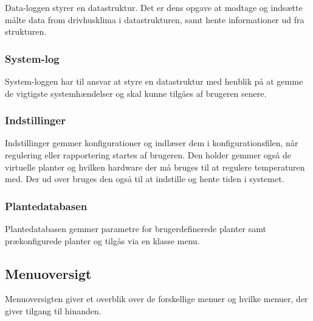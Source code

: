 Data-loggen styrer en datastruktur. Det er dens opgave at modtage og indsætte målte data from drivhusklima i datastrukturen, samt hente informationer ud fra strukturen.

\subsubsection{System-log}

System-loggen har til ansvar at styre en datastruktur med henblik på at gemme de vigtigste systemhændelser og skal kunne tilgåes af brugeren senere.

\subsubsection{Indstillinger}

Indstillinger gemmer konfigurationer og indlæser dem i konfigurationsfilen, når regulering eller rapportering startes af brugeren. Den holder gemmer også de virtuelle planter og hvilken hardware der må bruges til at regulere temperaturen med. Der ud over bruges den også til at indstille og hente tiden i systemet.

\subsubsection{Plantedatabasen}

Plantedatabasen gemmer parametre for brugerdefinerede planter samt prækonfigurede planter og tilgås via en klasse menu.

\clearpage

\subsection{Menuoversigt}

Menuoversigten giver et overblik over de forskellige menuer og hvilke menuer, der giver tilgang til hinanden.

